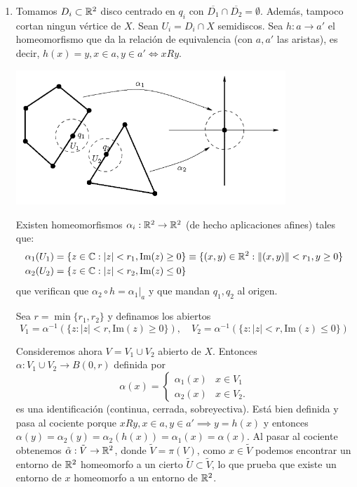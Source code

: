 {\begin{enumerate}
        \item Tomamos $D_i \subset \mathbb{R}^2$ disco centrado en $q_i$ con $\overline{D_1} \cap \overline{D_2} = \emptyset$. Además, tampoco cortan ningun vértice de $X$.
        Sean $U_i = D_i \cap X$ semidiscos. Sea $h : a \to a'$ el homeomorfismo que da la relación de equivalencia (con $a, a'$ las aristas), es decir, $h(x)=y, x \in a, y \in a' \iff xRy$. 
        
        \begin{center}
            \includegraphics[width=0.8\textwidth]{img/entornos-aristas.png}
        \end{center}

        Existen homeomorfismos $\alpha_i : \mathbb{R}^2 \to \mathbb{R}^2$ (de hecho aplicaciones afines) tales que: 
        \begin{align*}
        \alpha_1(U_1) &= \{z\in \mathbb{C} : |z| < r_1, \text{Im}(z) \ge 0\} \equiv \{(x,y)\in\mathbb{R}^2 : \|(x,y)\| < r_1, y \ge 0\}\\
        \alpha_2(U_2) &= \{z\in \mathbb{C} : |z| < r_2, \text{Im}(z) \le 0\}
        \end{align*}
        que verifican que $\alpha_2 \circ h = \alpha_1|_a$ y que mandan $q_1,q_2$ al origen.
        
        Sea $r = \min\{r_1, r_2\}$ y definamos los abiertos
        \[
        V_1 = \alpha^{-1}(\{z : |z|<r, \text{Im}(z) \ge 0\}),\quad V_2 = \alpha^{-1}(\{z : |z|<r, \text{Im}(z) \le 0\})
        \]
        
        Consideremos ahora $V=V_1 \cup V_2$ abierto de $X$. Entonces $\alpha : V_1 \cup V_2 \to B(0,r)$ definida por 
        \[
        \alpha(x) = \begin{cases}
            \alpha_1(x) & x \in V_1 \\
            \alpha_2(x) & x \in V_2.
        \end{cases}
        \]
        es una identificación (continua, cerrada, sobreyectiva). Está bien definida y pasa al cociente porque $xRy, x\in a, y \in a' \implies y = h(x)$ y entonces $\alpha(y) = \alpha_2(y) = \alpha_2(h(x)) = \alpha_1(x) = \alpha(x)$. Al pasar al cociente obtenemos $\tilde{\alpha}:\tilde{V}\to\mathbb{R}^2$, donde $\tilde{V}=\pi(V)$, como $x\in\tilde{V}$ podemos encontrar un entorno de $\mathbb{R}^2$ homeomorfo a un cierto $\tilde{U}\subset\tilde{V}$, lo que prueba que existe un entorno de $x$ homeomorfo a un entorno de $\mathbb{R}^2$.


\end{enumerate}}
